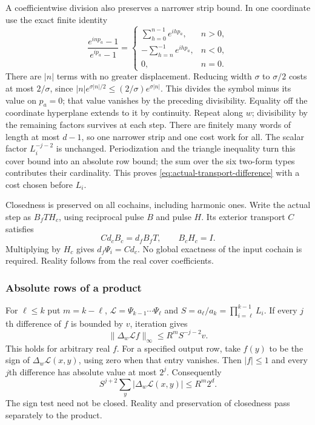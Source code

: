 A coefficientwise division also preserves a narrower strip bound.
In one coordinate use the exact finite identity
\[
 \frac{e^{inp_a}-1}{e^{ip_a}-1}
 =\begin{cases}
 \sum_{h=0}^{n-1}e^{ihp_a},&n>0,\\
 -\sum_{h=n}^{-1}e^{ihp_a},&n<0,\\
 0,&n=0.
 \end{cases}
\]
There are $|n|$ terms with no greater displacement. Reducing width
$\sigma$ to $\sigma/2$ costs at most $2/\sigma$, since
$|n|e^{\sigma|n|/2}\le(2/\sigma)e^{\sigma|n|}$.
This divides the symbol minus its value on $p_a=0$; that value
vanishes by the preceding divisibility. Equality off the coordinate
hyperplane extends to it by continuity. Repeat along $w$;
divisibility by the remaining factors survives at each step.
There are finitely many words of length at most $d-1$, so one
narrower strip and one cost work for all. The scalar factor
$L_i^{-j-2}$ is unchanged. Periodization and the triangle inequality
turn this cover bound into an absolute row bound; the sum over the
six two-form types contributes their cardinality. This proves
\eqref{eq:actual-transport-difference} with a cost chosen before $L_i$.

Closedness is preserved on all cochains, including harmonic ones.
Write the actual step as $B_f T H_c$, using reciprocal pulse $B$
and pulse $H$. Its exterior transport $C$ satisfies
\[
 C d_cB_c=d_fB_fT,\qquad B_cH_c=I.
\]
Multiplying by $H_c$ gives $d_f\Psi_i=Cd_c$. No global exactness
of the input cochain is required. Reality follows from the real
cover coefficients.

\subsubsection{Absolute rows of a product}

For $\ell\le k$ put $m=k-\ell$,
$\mathcal L=\Psi_{k-1}\cdots\Psi_\ell$ and
$S=a_\ell/a_k=\prod_{i=\ell}^{k-1}L_i$.
If every $j$th difference of $f$ is bounded by $v$, iteration gives
\[
       \|\Delta_w\mathcal Lf\|_\infty
                           \le R^mS^{-j-2}v.
\]
This holds for arbitrary real $f$. For a specified output row,
take $f(y)$ to be the sign of $\Delta_w\mathcal L(x,y)$, using
zero when that entry vanishes. Then $|f|\le1$ and every $j$th
difference has absolute value at most $2^j$. Consequently
\begin{equation}\label{eq:actual-cumulative-row}
 S^{j+2}\sum_y|\Delta_w\mathcal L(x,y)|\le R^m2^d.
\end{equation}
The sign test need not be closed. Reality and preservation of
closedness pass separately to the product.

